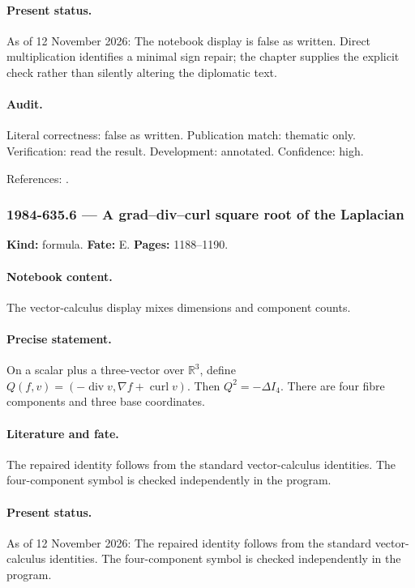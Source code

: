 \paragraph{Present status.} As of 12 November 2026: The notebook display is false as written. Direct multiplication identifies a minimal sign repair; the chapter supplies the explicit check rather than silently altering the diplomatic text.

\paragraph{Audit.} Literal correctness: false as written. Publication match: thematic only. Verification: read the result. Development: annotated. Confidence: high.

\noindent References: \citep{teleman1983signature}.\par

\subsubsection{1984-635.6 --- A grad--div--curl square root of the Laplacian}

\label{item:1984-635.6}

\noindent\textbf{Kind:} formula. \textbf{Fate:} E. \textbf{Pages:} 1188--1190.\par

\paragraph{Notebook content.} The vector-calculus display mixes dimensions and component counts.

\paragraph{Precise statement.} On a scalar plus a three-vector over \(\mathbb R^3\), define \(Q(f,v)=(-\operatorname{div}v,\nabla f+\operatorname{curl}v)\). Then \(Q^2=-\Delta I_4\). There are four fibre components and three base coordinates.

\paragraph{Literature and fate.} The repaired identity follows from the standard vector-calculus identities. The four-component symbol is checked independently in the program.

\paragraph{Present status.} As of 12 November 2026: The repaired identity follows from the standard vector-calculus identities. The four-component symbol is checked independently in the program.


